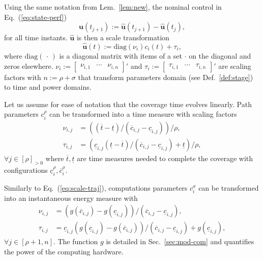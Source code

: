 \documentclass[letterpaper,10pt,journal,twoside]{IEEEtran}
\theoremstyle{definition}
\begin{document}
Using the same notation from Lem.~\ref{lem:new}, the nominal control in Eq.~(\ref{eq:state-perf})
\begin{equation}
  \mathbf{u}(t_{j+1}):=\hat{\mathbf{u}}(t_{j+1})-\hat{\mathbf{u}}(t_j),
\end{equation}
for all time instants. $\hat{\mathbf{u}}$ is then a scale transformation
\begin{equation}
  \hat{\mathbf{u}}(t):=\mathrm{diag}(\nu_i)c_i(t)+\tau_i,
\end{equation}
where $\mathrm{diag}(\,\cdot\,)$ is a diagonal matrix with items of a set $\cdot$ on the diagonal and zeros elsewhere. $\nu_i:=\begin{bmatrix}\nu_{i,1}&\cdots&\nu_{i,n}\end{bmatrix}'$ and $\tau_i:=\begin{bmatrix}\tau_{i,1}&\cdots&\tau_{i,n}\end{bmatrix}'$ are scaling factors with $n:=\rho+\sigma$ that transform parameters domain (see Def.~\ref{def:stage}) to time and power domains.

Let us assume for ease of notation that the coverage time evolves linearly. Path parameters $c_i^\rho$ can be transformed into a time measure with scaling factors\begin{subequations}\label{eq:scale-traj}\begin{align}
  \nu_{i,j}&=\left((\overline{t}-\underline{t})/(\overline{c}_{i,j}-\underline{c}_{i,j})\right)/\rho,\\
  \tau_{i,j}&=\left(\underline{c}_{i,j}(\underline{t}-\overline{t})/(\overline{c}_{i,j}-\underline{c}_{i,j})+\underline{t}\right)/\rho,
\end{align}\end{subequations} 
$\forall j\in[\rho]_{>0}$ where $\overline{t},\underline{t}$ are time measures needed to complete the coverage with configurations $\underline{c}_i^\rho,\overline{c}_i^\rho$.

Similarly to Eq.~(\ref{eq:scale-traj}), computations parameters $c_i^\sigma$ can be transformed into an instantaneous energy measure with %
\begin{subequations}\label{eq:scale-comp}\begin{align}
  \nu_{i,j}&=(g(\overline{c}_{i,j})-g(\underline{c}_{i,j}))/(\overline{c}_{i,j}-\underline{c}_{i,j}),\\
  \tau_{i,j}&=\underline{c}_{i,j}(g(\underline{c}_{i,j})-g(\overline{c}_{i,j}))/(\overline{c}_{i,j}-\underline{c}_{i,j})+g(\underline{c}_{i,j}),
\end{align}\end{subequations}
$\forall j\in[\rho+1,n]$. The function $g$ is detailed in Sec.~\ref{sec:mod-com} and quantifies the power of the computing hardware.
\end{document}
